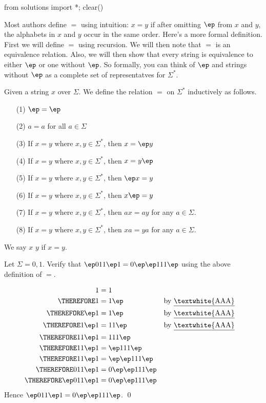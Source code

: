 \begin{python0}
from solutions import *; clear()
\end{python0}

Most authors define $=$ using intuition: $x=y$ if after omitting
$\ep$ from $x$ and $y$, the alphabets in $x$ and $y$ occur in the
same order. Here's a more formal definition. First we will define
$=$ using recursion. We will then note that $=$ is an equivalence
relation. Also, we will then show that every string is equivalence
to either $\ep$ or one without $\ep$. So formally, you can think of
$\ep$ and strings without $\ep$ as a complete set of representatves
for $\Sigma^*$.

\begin{defn}
Given a string $x$ over $\Sigma$. We define the relation $=$ on
$\Sigma^*$ inductively as follows.
\begin{itemize}
\item[(1)] $\ep = \ep$
\item[(2)] $a = a$ for all $a \in \Sigma$
\item[(3)] If $x = y$ where $x,y \in \Sigma^*$, then $x = \ep y$
\item[(4)] If $x = y$ where $x,y \in \Sigma^*$, then $x = y \ep$
\item[(5)] If $x = y$ where $x,y \in \Sigma^*$, then $\ep x = y$
\item[(6)] If $x = y$ where $x,y \in \Sigma^*$, then $x \ep = y$
\item[(7)] If $x = y$ where $x,y \in \Sigma^*$, then $ax = ay$ for any $a \in \Sigma$.
\item[(8)] If $x = y$ where $x,y \in \Sigma^*$, then $xa = ya$ for any $a \in \Sigma$.
\end{itemize}
We say $x$  $y$
if $x=y$.
\end{defn}



\newpage
\begin{ex}
Let $\Sigma = {0,1}$. Verify that $\ep 011 \ep 1 = 0 \ep\ep 111
\ep$ using the above definition of $=$.
\end{ex}

\SOLUTION
\begin{align*}
 1 &= 1 \cr
\THEREFORE         1 &= 1\ep                  & & \text{by \underline{\textwhite{AAA}}} \cr
\THEREFORE     \ep 1 &= 1\ep                  & & \text{by \underline{\textwhite{AAA}}} \cr
\THEREFORE   1 \ep 1 &= 11 \ep                & & \text{by \underline{\textwhite{AAA}}} \cr
\THEREFORE  11 \ep 1 &= 111 \ep                 \cr
\THEREFORE  11 \ep 1 &= \ep 111 \ep             \cr
\THEREFORE  11 \ep 1 &= \ep\ep 111 \ep          \cr
\THEREFORE 011 \ep 1 &= 0 \ep\ep 111 \ep        \cr
\THEREFORE \ep 011 \ep 1 &= 0 \ep\ep 111 \ep    \cr
\end{align*}
Hence $\ep 011 \ep 1 = 0 \ep\ep 111 \ep$.
\qed

